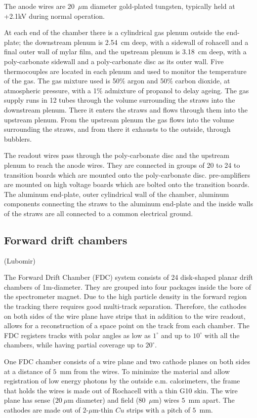The anode wires are 20~$\mu$m diameter gold-plated tungsten, typically held at +2.1kV during normal operation. 


At each end of the chamber there is a cylindrical gas plenum outside the end-plate; the downstream plenum is 2.54~cm deep, with a sidewall of rohacell and a final outer wall of mylar film, and the upstream plenum is 3.18~cm deep, with a poly-carbonate sidewall and a poly-carbonate disc as its outer wall. 
Five thermocouples are located in each plenum and used to monitor the temperature of the gas.
The gas mixture used is 50$\%$ argon and 50$\%$ carbon dioxide, at atmospheric pressure, with a 1$\%$ admixture of propanol to delay ageing.
The gas supply runs in 12 tubes through the volume surrounding the straws into the downstream plenum. 
There it enters the straws and flows through them into the upstream plenum. From the upstream plenum the gas flows into the volume surrounding the straws, and from there it exhausts to the outside, through bubblers.

The readout wires pass through the poly-carbonate disc and the upstream plenum to reach the anode wires. 
They are connected in groups of 20 to 24 to transition boards which are mounted onto the poly-carbonate disc. pre-amplifiers\cite{Barbosa2007} are mounted on high voltage boards which are bolted onto the transition boards. The aluminum end-plate, outer cylindrical wall of the chamber, aluminum components connecting the straws to the aluminum end-plate and the inside walls of the straws are all connected to a common electrical ground. 

\subsection{Forward drift chambers}(Lubomir)
\label{sec:fdc}

The Forward Drift Chamber (FDC) system consists of 24 disk-shaped planar drift chambers of 1m-diameter.
They are grouped into four packages inside the bore of the spectrometer magnet.
Due to the high particle density in the forward region the tracking there requires
good multi-track separation.
Therefore, the cathodes on both sides of the wire plane have strips that in addition to the wire readout, allows for a  reconstruction of a space point on the track from each chamber. 
The FDC registers tracks with polar angles as low as $1^\circ$ and up to $10^\circ $
with all the chambers, while having partial coverage up to $20^\circ$.

One FDC chamber consists of a wire plane and two cathode planes on both sides at a distance of $5$~mm from the wires. 
To minimize the material and allow registration of low energy photons by the outside e.m. calorimeters,
the frame that holds the wires is made out of Rochacell with a thin G10 skin.
The wire plane has sense ($20~\mu$m diameter) and field ($80$~$\mu$m) wires $5$~mm apart.
The cathodes are made out of $2$-$\mu$m-thin $Cu$ strips with a pitch of $5$~mm.

